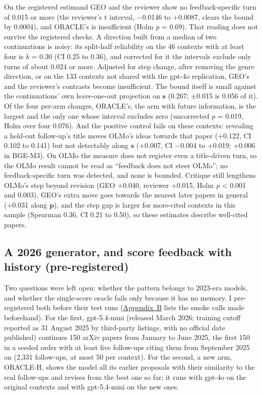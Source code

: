 \documentclass[
  10pt,
]{article}
\begin{document}
On the registered estimand GEO and the
reviewer show no feedback-specific turn
of 0.015 or more (the reviewer's t
interval, −0.0146 to +0.0087, clears the
bound by 0.0004), and ORACLE's is
insufficient (Holm \emph{p} = 0.69).
That reading does not survive the
registered checks. A direction built
from a median of two continuations is
noisy: its split-half reliability on the
46 contexts with at least four is λ =
0.30 (CI 0.25 to 0.36), and corrected
for it the intervals exclude only turns
of about 0.024 or more. Adjusted for
step change, after removing the genre
direction, or on the 133 contexts not
shared with the gpt-4o replication,
GEO's and the reviewer's contrasts
become insufficient. The bound itself is
small against the continuations' own
leave-one-out projection on
\(\mathbf{s}\) (0.267; ±0.015 is 0.056
of it). Of the four per-arm changes,
ORACLE's, the arm with future
information, is the largest and the only
one whose interval excludes zero
(uncorrected \emph{p} = 0.019, Holm over
four 0.076). And the positive control
fails on these contexts: revealing a
held-out follow-up's title moves OLMo's
ideas towards that paper (+0.122, CI
0.102 to 0.141) but not detectably along
\(\mathbf{s}\) (+0.007, CI −0.004 to
+0.019; +0.006 in BGE-M3). On OLMo the
measure does not register even a
title-driven turn, so the OLMo result
cannot be read as ``feedback does not
steer OLMo''; no feedback-specific turn
was detected, and none is bounded.
Critique still lengthens OLMo's step
beyond revision (GEO +0.040, reviewer
+0.015, Holm \emph{p} \textless{} 0.001
and 0.003), GEO's extra move goes
towards the nearest later papers in
general (+0.031 along \(\mathbf{p}\)),
and the step gap is larger for
more-cited contexts in this sample
(Spearman 0.36, CI 0.21 to 0.50), so
these estimates describe well-cited
papers.

\subsection{A 2026 generator, and score feedback with history (pre-registered)}\label{sec:5.4}

Two questions were left open: whether
the pattern belongs to 2023-era models,
and whether the single-score oracle
fails only because it has no memory. I
pre-registered both before their test
runs (\hyperref[app:B]{Appendix~B} lists
the smoke calls made beforehand). For
the first, gpt-5.4-mini (released March
2026; training cutoff reported as 31
August 2025 by third-party listings,
with no official date published)
continues 150 arXiv papers from January
to June 2025, the first 150 in a seeded
order with at least five follow-ups
citing them from September 2025 on
(2,331 follow-ups, at most 50 per
context). For the second, a new arm,
ORACLE-H, shows the model all its
earlier proposals with their similarity
to the real follow-ups and revises from
the best one so far; it runs with gpt-4o
on the original contexts and with
gpt-5.4-mini on the new ones.
\end{document}
